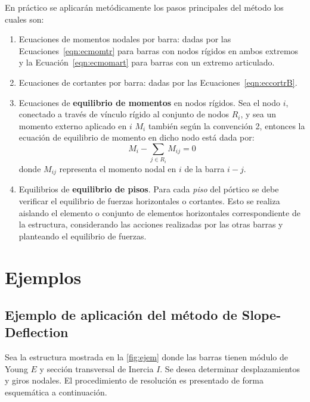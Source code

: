 En práctico se aplicarán metódicamente los pasos principales del método los cuales son:
%
\begin{enumerate}
	\item Ecuaciones de momentos nodales por barra: dadas por las Ecuaciones~\eqref{eqn:ecmomtr} para barras con nodos rígidos en ambos extremos y la Ecuación~\eqref{eqn:ecmomart} para barras con un extremo articulado. 
	
	\item Ecuaciones de cortantes por barra: dadas por las Ecuaciones~\eqref{eqn:eccortrB}.
	\item Ecuaciones de \textbf{equilibrio de momentos} en nodos rígidos. Sea el nodo $i$, conectado a través de vínculo rígido al conjunto de nodos $R_i$, y sea un momento externo aplicado en $i$ $M_i$ también según la convención 2, entonces la ecuación de equilibrio de momento en dicho nodo está dada por:
	$$
	M_i -\sum_{j\in R_i} M_{ij} = 0
	$$
	donde $M_{ij}$ representa el momento nodal en $i$ de la barra $i-j$.
	
	\item Equilibrios de \textbf{equilibrio de pisos}. Para cada \textit{piso} del pórtico se debe verificar el equilibrio de fuerzas horizontales o cortantes. Esto se realiza aislando el elemento o conjunto de elementos horizontales correspondiente de la estructura, considerando las acciones realizadas por las otras barras y planteando el equilibrio de fuerzas.
	
\end{enumerate}


\section{Ejemplos}



\subsection{Ejemplo de aplicación del método de Slope-Deflection}

Sea la estructura mostrada en la \autoref{fig:ejem} donde las barras tienen módulo de Young $E$ y sección transversal de Inercia $I$. %
%
Se desea determinar desplazamientos y giros nodales. %
El procedimiento de resolución es presentado de forma esquemática a continuación.

